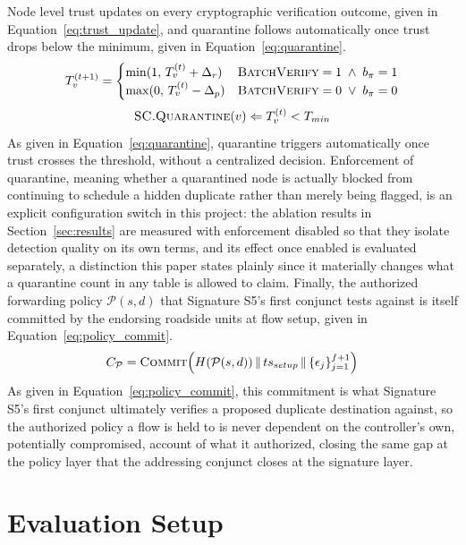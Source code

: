 \documentclass[final,5p,twocolumn]{elsarticle}
\theoremstyle{remark}
\theoremstyle{plain}
\begin{document}
Node level trust updates on every cryptographic verification outcome, given
in Equation~\eqref{eq:trust_update}, and quarantine follows automatically
once trust drops below the minimum, given in Equation~\eqref{eq:quarantine}.
\begin{equation}
	T_v^{(t+1)} =
	\begin{cases}
		\min(1,\, T_v^{(t)} + \Delta_r) & \textsc{BatchVerify} = 1 \;\land\; b_{\pi} = 1 \\
		\max(0,\, T_v^{(t)} - \Delta_p) & \textsc{BatchVerify} = 0 \;\lor\; b_{\pi} = 0
	\end{cases}
	\label{eq:trust_update}
\end{equation}
\begin{equation}
	\textsc{SC.Quarantine}(v) \Leftarrow T_v^{(t)} < T_{min}
	\label{eq:quarantine}
\end{equation}
As given in Equation~\eqref{eq:quarantine}, quarantine triggers
automatically once trust crosses the threshold, without a centralized
decision. Enforcement of quarantine, meaning whether a quarantined node is
actually blocked from continuing to schedule a hidden duplicate rather than
merely being flagged, is an explicit configuration switch in this project:
the ablation results in Section~\ref{sec:results} are measured with
enforcement disabled so that they isolate detection quality on its own
terms, and its effect once enabled is evaluated separately, a distinction
this paper states plainly since it materially changes what a quarantine
count in any table is allowed to claim. Finally, the authorized forwarding
policy $\mathcal{P}(s,d)$ that Signature S5's first conjunct tests against
is itself committed by the endorsing roadside units at flow setup, given in
Equation~\eqref{eq:policy_commit}.
\begin{equation}
	C_{\mathcal{P}} = \textsc{Commit}\!\left(H(\mathcal{P}(s,d)) \,\|\, ts_{setup} \,\|\, \{\epsilon_j\}_{j=1}^{f+1}\right)
	\label{eq:policy_commit}
\end{equation}
As given in Equation~\eqref{eq:policy_commit}, this commitment is what
Signature S5's first conjunct ultimately verifies a proposed duplicate
destination against, so the authorized policy a flow is held to is never
dependent on the controller's own, potentially compromised, account of
what it authorized, closing the same gap at the policy layer that the
addressing conjunct closes at the signature layer.



\section{Evaluation Setup}
\label{sec:evaluation_setup}
\end{document}
